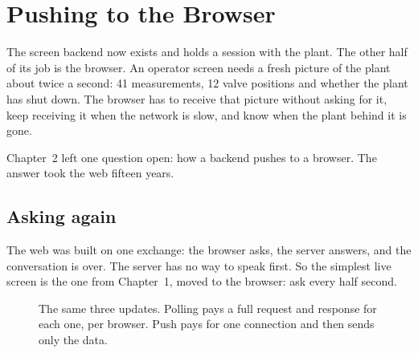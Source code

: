 \chapter{Pushing to the Browser}

The screen backend now exists and holds a session with the plant. The other half
of its job is the browser. An operator screen needs a fresh picture of the plant
about twice a second: 41 measurements, 12 valve positions and whether the plant
has shut down. The browser has to receive that picture without asking for it,
keep receiving it when the network is slow, and know when the plant behind it is
gone.

Chapter~2 left one question open: how a backend pushes to a browser. The answer
took the web fifteen years.

\section{Asking again}

The web was built on one exchange: the browser asks, the server answers, and
the conversation is over. The server has no way to speak first. So the simplest
live screen is the one from Chapter~1, moved to the browser: ask every half
second.

\begin{figure}[htbp]
\centering
{}
\caption{The same three updates. Polling pays a full request and response for
each one, per browser. Push pays for one connection and then sends only the
data.}
\end{figure}

